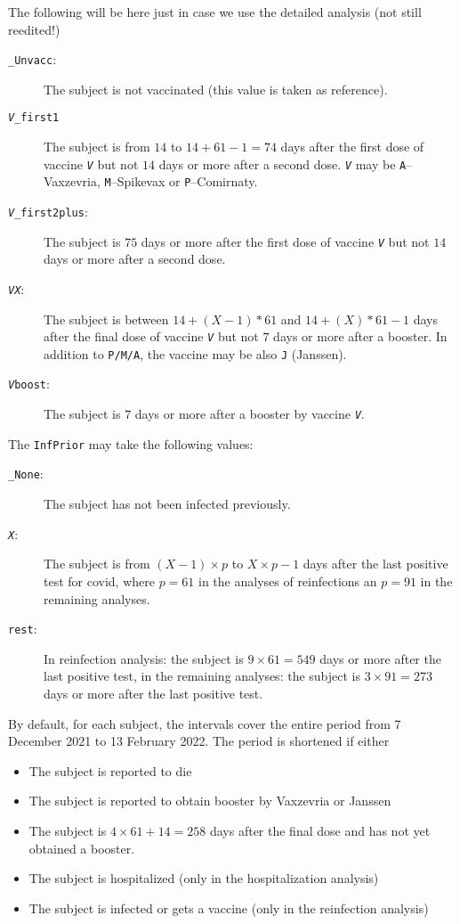 \documentclass[preprint,12pt,authoryear]{elsarticle}
\begin{document}
{\color{blue} The following will be here just in case we use the detailed analysis (not still reedited!)
\begin{description}
\item[{\tt \_Unvacc}:] The subject is not vaccinated (this value is taken as reference).
\item[{\tt \emph{V}\_first1}] The subject is from $14$ to $14+61-1=74$ days after the first dose of vaccine {\tt \emph{V}} but not $14$ days or more after a second dose. {\tt \emph{V}} may be {\tt A}--Vaxzevria, {\tt M}--Spikevax or {\tt P}--Comirnaty.
\item[{\tt \emph{V}\_first2plus}:] The subject is $75$ days or more after the first dose of vaccine {\tt \emph{V}} but not $14$ days or more after a second dose.
\item[{\tt \emph{VX}}:] The subject is between $14+(X-1)*61$ and $14+(X)*61-1$ days after the final dose of vaccine {\tt \emph{V}} but not $7$ days or more after a booster. In addition to {\tt P/M/A}, the vaccine may be also {\tt J} (Janssen).
\item[{\tt \emph{V}boost}:] The subject is $7$ days or more after a booster by vaccine {\tt \emph{V}}.
\end{description}
The {\tt InfPrior} may take the following values:
\begin{description}
\item[{\tt \_None}:] The subject has not been infected previously.
\item[{\tt \emph{X}}:] The subject is from $(X-1)\times p$ to $X\times p - 1$ days after the last positive test for covid, where $p=61$ in the analyses of reinfections an $p=91$ in the remaining analyses.
\item[{\tt rest}:] In reinfection analysis: the subject is $9 \times 61 = 549$ days or more after the last positive test, in the remaining analyses: the subject is $3 \times 91 = 273$ days or more after the last positive test. 
\end{description}
}
By default, for each subject, the intervals cover the entire period from 7 December 2021 to 13 February 2022. The period is shortened if either
\begin{itemize} 
\item The subject is reported to die
\item The subject is reported to obtain booster by Vaxzevria or Janssen
\item The subject is $4 \times 61 + 14 = 258$ days after the final dose and has not yet obtained a booster.
\item The subject is hospitalized (only in the hospitalization analysis)
\item The subject is infected or gets a vaccine (only in the reinfection analysis)
\end{itemize}
\end{document}
